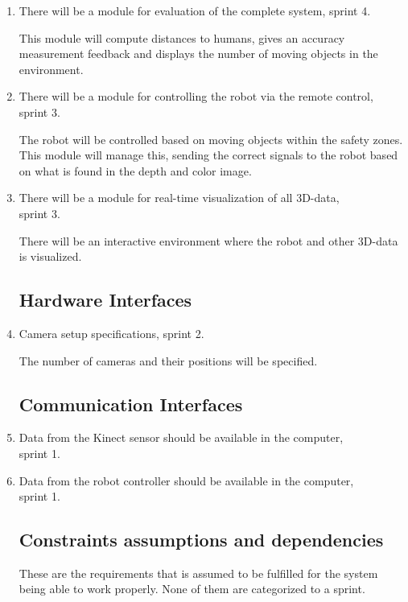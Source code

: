 \documentclass[10pt,a4paper]{article}
\begin{document}
\begin{enumerate}
\item There will be a module for evaluation of the complete system, sprint 4.

{\addtolength{\leftskip}{5mm}This module will compute distances to humans, gives an accuracy measurement feedback and displays the number of moving objects in the environment. 
\par}

\item There will be a module for controlling the robot via the remote control, sprint 3.

{\addtolength{\leftskip}{5mm}The robot will be controlled based on moving objects within the safety zones. This module will manage this, sending the correct signals to the robot based on what is found in the depth and color image.
\par}

\item There will be a module for real-time visualization of all 3D-data,\\ sprint 3.

{\addtolength{\leftskip}{5mm}There will be an interactive environment where the robot and other 3D-data is visualized.\par}

\subsection{Hardware Interfaces}

\item Camera setup specifications, sprint 2.

{\addtolength{\leftskip}{5mm} The number of cameras and their positions will be specified.\par}

\subsection{Communication Interfaces}

\item Data from the Kinect sensor should be available in the computer, \\sprint 1.
\item Data from the robot controller should be available in the computer, \\sprint 1.

\subsection{Constraints assumptions and dependencies}
These are the requirements that is assumed to be fulfilled for the system being able to work properly. None of them are categorized to a sprint.


\end{enumerate}
\end{document}
